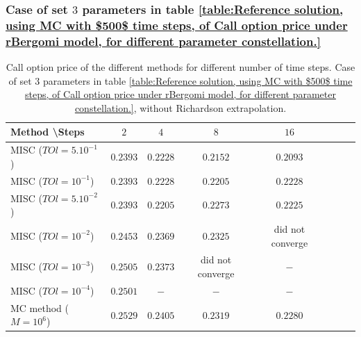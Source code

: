 \documentclass[11pt]{article}
\begin{document}
\subsubsection{Case of set $3$ parameters in table \ref{table:Reference solution, using MC with $500$ time steps, of Call option price under rBergomi model, for different parameter constellation.}}\label{sec:Case of set 3 parameters}
\begin{table}[h!]
	\centering
	\begin{tabular}{l*{6}{c}r}
		Method \textbackslash  Steps            & $2$ & $4$ & $8$ & $16$ &   \\
		\hline
		MISC ($TOl=5.10^{-1}$)  & $0.2393$ & $0.2228$ & $0.2152$ & $0.2093$  \\
		MISC ($TOl=10^{-1}$)  & $0.2393$ & $0.2228$ & $0.2205$ & $0.2228$  \\
		MISC ($TOl=5.10^{-2}$)  & $0.2393$ & $0.2205$ & $0.2273$ & $0.2225$  \\
		MISC ($TOl=10^{-2}$)  & $0.2453$ & $0.2369$ & $0.2325$ & did not converge  \\
		MISC ($TOl=10^{-3}$)  & $0.2505$ & $0.2373$ & did not converge & $-$  \\
		MISC ($TOl=10^{-4}$)  & $0.2501$ & $-$ & $-$ & $-$  \\
		\hline
		MC method ($M=10^{6}$)   & $ 0.2529$ & $  0.2405$  & $ 0.2319
		$ & $   0.2280$ \\		
		
		\hline
	\end{tabular}
	\caption{ Call option price of the different methods for different number of time steps. Case of set $3$ parameters in table \ref{table:Reference solution, using MC with $500$ time steps, of Call option price under rBergomi model, for different parameter constellation.}, without Richardson extrapolation.}
	\label{table: Call option price of the different methods for different number of time steps. Case set 3}
\end{table}
\end{document}
